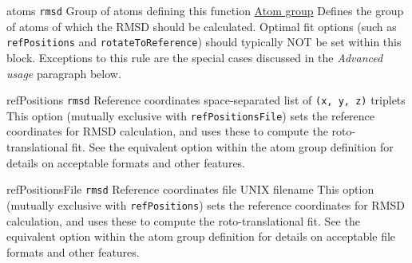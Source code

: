 \begin{cvcoptions}

\item %
  \key
    {atoms}{%
    \texttt{rmsd}}{%
    Group of atoms defining this function}{%
    \hyperref[sec:colvar_atom_groups]{Atom group}}{%
    Defines the group of atoms of which the RMSD should be calculated.
    Optimal fit options (such as \texttt{refPositions} and
    \texttt{rotateToReference}) should typically NOT be set within this
    block. Exceptions to this rule are the special cases discussed in
    the \emph{Advanced usage} paragraph below.
    }

\item %
  \key
    {refPositions}{%
    \texttt{rmsd}}{%
    Reference coordinates}{%
    space-separated list of \texttt{(x, y, z)} triplets}{%
    This option (mutually exclusive with \texttt{refPositionsFile}) sets the reference coordinates for RMSD calculation, and uses these to compute the roto-translational fit.
    See the equivalent option  within the atom group definition for details on acceptable formats and other features.
    }

\item %
  \key
    {refPositionsFile}{%
    \texttt{rmsd}}{%
    Reference coordinates file}{%
    UNIX filename}{%
    This option (mutually exclusive with \texttt{refPositions}) sets the reference coordinates for RMSD calculation, and uses these to compute the roto-translational fit.
    See the equivalent option  within the atom group definition for details on acceptable file formats and other features.
    }



\end{cvcoptions}
